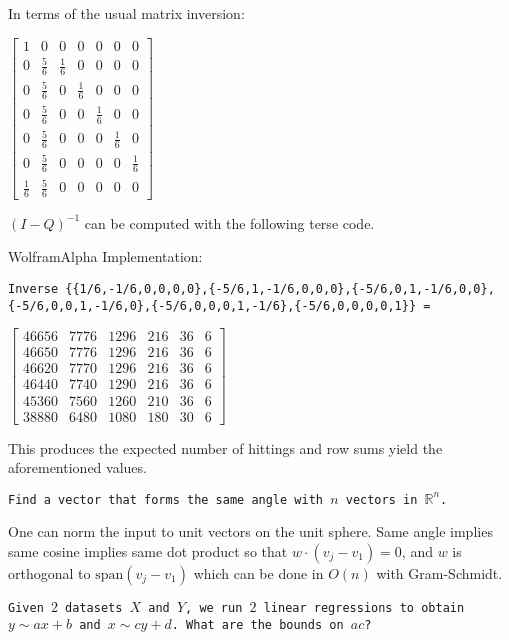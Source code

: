 In terms of the usual matrix inversion:

$
\begin{bmatrix}
1  &  0  &  0  &  0  &  0  &  0  & 0 \\
0 &  \frac{5}{6} & \frac{1}{6} &  0 &   0 &   0 &  0 \\
0 &  \frac{5}{6} &  0 &  \frac{1}{6} &  0 &   0 &  0 \\
0 &  \frac{5}{6} &  0 &   0 &  \frac{1}{6} &  0 &  0 \\
0 &  \frac{5}{6} &  0 &   0 &   0 &  \frac{1}{6} & 0 \\
0 &  \frac{5}{6} &  0 &   0 &   0 &   0 & \frac{1}{6} \\
\frac{1}{6} & \frac{5}{6} &  0 &   0 &   0 &   0 &  0
\end{bmatrix}
$

$(I-Q)^{-1}$ can be computed with the following terse code.

WolframAlpha Implementation:

\begin{verbatim}
Inverse {{1/6,-1/6,0,0,0,0},{-5/6,1,-1/6,0,0,0},{-5/6,0,1,-1/6,0,0},
{-5/6,0,0,1,-1/6,0},{-5/6,0,0,0,1,-1/6},{-5/6,0,0,0,0,1}} =
\end{verbatim}

$
\begin{bmatrix}
46656 & 7776 & 1296 & 216 & 36 & 6 \\
46650 & 7776 & 1296 & 216 & 36 & 6 \\
46620 & 7770 & 1296 & 216 & 36 & 6 \\
46440 & 7740 & 1290 & 216 & 36 & 6 \\
45360 & 7560 & 1260 & 210 & 36 & 6 \\
38880 & 6480 & 1080 & 180 & 30 & 6
\end{bmatrix}
$

This produces the expected number of hittings and row sums yield the aforementioned values.

\texttt{Find a vector that forms the same angle with $n$ vectors in $\mathbb{R}^n$.}

One can norm the input to unit vectors on the unit sphere. Same angle implies same cosine implies same dot product so that $w \cdot (v_j-v_1)=0$, and $w$ is orthogonal to $\text{span}(v_j-v_1)$ which can be done in $O(n)$ with Gram-Schmidt.

\texttt{Given $2$ datasets $X$ and $Y$, we run $2$ linear regressions to obtain $y \sim ax + b$ and $x \sim cy + d$. What are the bounds on $ac$?}

